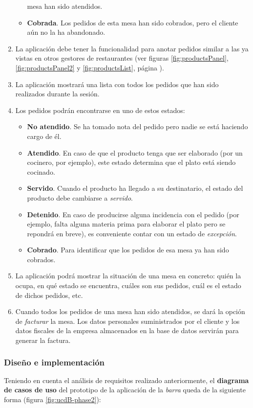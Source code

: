 \begin{enumerate}
\begin{itemize}
  mesa han sido atendidos.
  \item \textbf{Cobrada}. Los pedidos de esta mesa han sido cobrados, pero el
  cliente aún no la ha abandonado.
  \end{itemize}
\item La aplicación debe tener la funcionalidad para anotar pedidos similar a 
las ya vistas en otros gestores de restaurantes (ver figuras
\ref{fig:productsPanel}, \ref{fig:productsPanel2} y \ref{fig:productsList},
página \pageref{fig:productsPanel}).
\item La aplicación mostrará una lista con todos los pedidos que han sido
realizados durante la sesión.
\item Los pedidos podrán encontrarse en uno de estos estados:
  \begin{itemize}
  \item \textbf{No atendido}. Se ha tomado nota del pedido pero nadie se está
  haciendo cargo de él.
  \item \textbf{Atendido}. En caso de que el producto tenga que ser elaborado
  (por un cocinero, por ejemplo), este estado determina que el plato está
  siendo cocinado.
  \item \textbf{Servido}. Cuando el producto ha llegado a su destinatario, el
  estado del producto debe cambiarse a \emph{servido}.
  \item \textbf{Detenido}. En caso de producirse alguna incidencia con el
  pedido (por ejemplo, falta alguna materia prima para elaborar
  el plato pero se repondrá en breve), es conveniente contar con un estado
  de \emph{excepción}.
  \item \textbf{Cobrado}. Para identificar que los pedidos de esa mesa ya han
  sido cobrados.
  \end{itemize}
\item La aplicación podrá mostrar la situación de una mesa en concreto: quién
la ocupa, en qué estado se encuentra, cuáles son sus pedidos, cuál es el
estado de dichos pedidos, etc.
\item Cuando todos los pedidos de una mesa han sido atendidos, se dará la
opción de \emph{facturar} la mesa. Los datos personales suministrados por el
cliente y los datos fiscales de la empresa almacenados en la base de datos
servirán para generar la factura.
\end{enumerate}

\subsubsection{Diseño e implementación}
Teniendo en cuenta el análisis de requisitos realizado anteriormente, el
\textbf{diagrama de casos de uso} del prototipo de la aplicación de la
\emph{barra} queda de la siguiente forma (figura \ref{fig:ucdB-phase2}):

